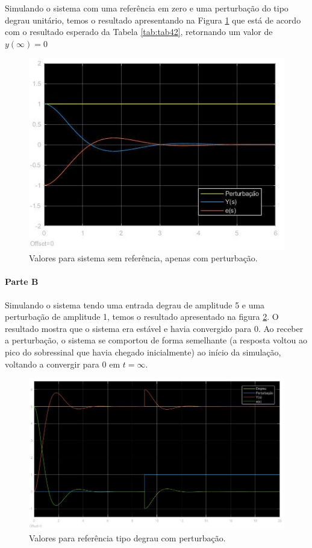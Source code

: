 \documentclass[
]{book}
\begin{document}
Simulando o sistema com uma referência em zero e uma perturbação do tipo degrau unitário, temos o resultado apresentando na Figura \ref{fig:fig43A1} que está de acordo com o resultado esperado da Tabela \ref{tab:tab42}, retornando um valor de \(y(\infty) = 0\)

\begin{figure}
\includegraphics[width=0.8\linewidth]{Imagens/Lab4/Resolução/prob3A1} \caption{Valores para sistema sem referência, apenas com perturbação.}\label{fig:fig43A1}
\end{figure}

\hypertarget{parte-b-3}{%
\paragraph*{Parte B}\label{parte-b-3}}

Simulando o sistema tendo uma entrada degrau de amplitude 5 e uma perturbação de amplitude 1, temos o resultado apresentado na figura \ref{fig:fig43B1}. O resultado mostra que o sistema era estável e havia convergido para 0. Ao receber a perturbação, o sistema se comportou de forma semelhante (a resposta voltou ao pico do sobressinal que havia chegado inicialmente) ao início da simulação, voltando a convergir para 0 em \(t=\infty\).

\begin{figure}
\includegraphics[width=0.8\linewidth]{Imagens/Lab4/Resolução/prob3B1} \caption{Valores para referência tipo degrau com perturbação.}\label{fig:fig43B1}
\end{figure}
\end{document}
